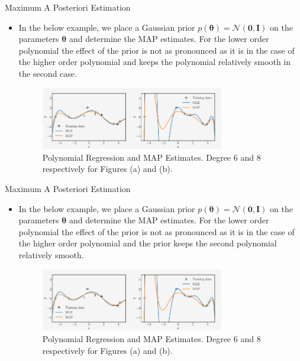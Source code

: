 \documentclass{beamer}
\begin{document}
\begin{frame}{Maximum A Posteriori Estimation}
\begin{itemize}[<+->]
\item In the below example, we place a Gaussian prior $p(\boldsymbol{\theta}) = \mathcal{N}(\boldsymbol{0}, \boldsymbol{I})$ on the parameters $\boldsymbol{\theta}$ and determine the MAP estimates. For the lower order polynomial the effect of the prior is not as pronounced as it is in the case of the higher order polynomial and keeps the polynomial relatively smooth in the second case.

\begin{figure}[htp]
\centering
\includegraphics[width=8cm]{figures/map.png}
\caption{Polynomial Regression and MAP Estimates. Degree 6 and 8 respectively for Figures (a) and (b).}
\label{fig:map}
\end{figure}

\end{itemize}
\end{frame}
\begin{frame}{Maximum A Posteriori Estimation}
\begin{itemize}[<+->]
\item In the below example, we place a Gaussian prior $p(\boldsymbol{\theta}) = \mathcal{N}(\boldsymbol{0}, \boldsymbol{I})$ on the parameters $\boldsymbol{\theta}$ and determine the MAP estimates. For the lower order polynomial the effect of the prior is not as pronounced as it is in the case of the higher order polynomial and the prior keeps the second polynomial relatively smooth.

\begin{figure}[htp]
\centering
\includegraphics[width=8cm]{figures/map.png}
\caption{Polynomial Regression and MAP Estimates. Degree 6 and 8 respectively for Figures (a) and (b).}
\label{fig:map}
\end{figure}

\end{itemize}
\end{frame}
\end{document}

